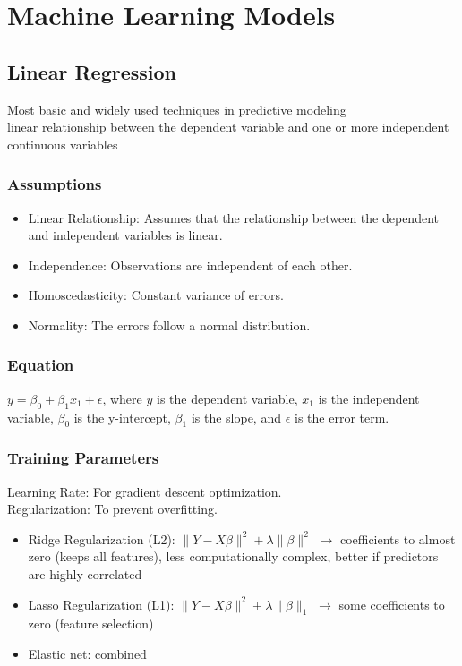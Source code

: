 \documentclass[english, threecolumn]{latex4ei/latex4ei_sheet}
\begin{document}
\section{Machine Learning Models}
\begin{sectionbox}
\subsection{Linear Regression}
Most basic and widely used techniques in predictive modeling\\
linear relationship between the dependent variable and one or more independent continuous variables
\subsubsection{Assumptions}
\begin{itemize}
    \item Linear Relationship: Assumes that the relationship between the dependent and independent variables is linear.
    \item Independence: Observations are independent of each other.
    \item Homoscedasticity: Constant variance of errors.
    \item Normality: The errors follow a normal distribution.
\end{itemize}

\subsubsection{Equation}
\(y = \beta_0 + \beta_1 x_1 + \epsilon\), where \(y\) is the dependent variable, \(x_1\) is the independent variable, \(\beta_0\) is the y-intercept, \(\beta_1\) is the slope, and \(\epsilon\) is the error term.

\subsubsection{Training Parameters}
Learning Rate: For gradient descent optimization.\\
Regularization: To prevent overfitting.
\begin{itemize}
    \item Ridge Regularization (L2): $\|Y-X \beta\|^{2}+\lambda\|\beta\|^{2}$ $\rightarrow$ coefficients to almost zero (keeps all features), less computationally complex, better if predictors are highly correlated
    \item Lasso Regularization (L1): $\|Y-X \beta\|^{2}+\lambda\|\beta\|_{1}$ $\rightarrow$ some coefficients to zero (feature selection)
    \item Elastic net: combined
\end{itemize}


\end{sectionbox}
\end{document}

